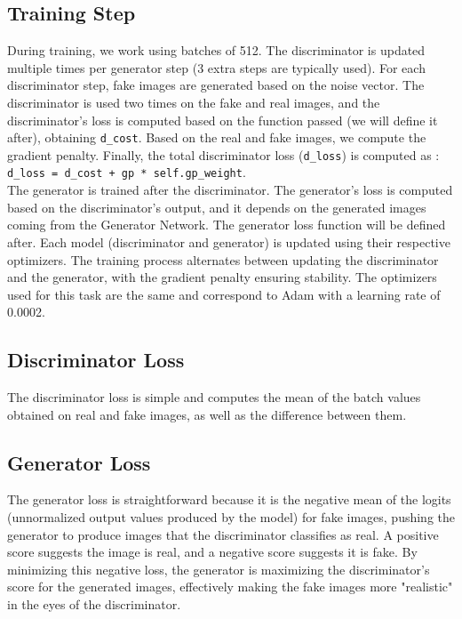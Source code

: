 \subsection*{Training Step}
During training, we work using batches of 512. 
The discriminator is updated multiple times per generator 
step (3 extra steps are typically used). 
For each discriminator step, fake images are generated 
based on the noise vector. The discriminator is used 
two times on the fake and real images, and the discriminator's 
loss is computed based on the function passed (we will define it after), 
obtaining \texttt{d\_cost}. 
Based on the real and fake images, we compute the gradient penalty. 
Finally, the total discriminator loss (\texttt{d\_loss}) 
is computed as : 
\\
\texttt{d\_loss = d\_cost + gp * self.gp\_weight}.
\\
The generator is trained after the discriminator. 
The generator's loss is computed based on the discriminator's output, 
and it depends on the generated images coming from the Generator 
Network. The generator loss function will be defined after.
Each model (discriminator and generator) is updated using their 
respective optimizers. The training process alternates between 
updating the discriminator and the generator, with 
the gradient penalty ensuring stability.
The optimizers used for this task are the same and correspond to 
Adam with a learning rate of 0.0002.
\\
\subsection*{Discriminator Loss}
The discriminator loss is simple and computes the mean of the 
batch values obtained on real and fake images, as well 
as the difference between them.
\subsection*{Generator Loss}
The generator loss is straightforward because it is 
the negative mean of the logits (unnormalized output values 
produced by the model) for fake images, 
pushing the generator to produce images that the discriminator 
classifies as real. A positive score suggests 
the image is real, and a negative score suggests it is fake. 
By minimizing this negative loss, the generator is maximizing 
the discriminator’s score for the generated images, 
effectively making the fake images more "realistic" in the 
eyes of the discriminator.
